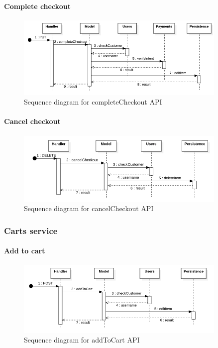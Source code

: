 \paragraph*{Complete checkout}
\begin{figure}[H]
    \includegraphics[width=0.9\textwidth]{res/images/sequence-diagrams/orders/completeCheckout.png}
    \caption{Sequence diagram for completeCheckout API}
\end{figure}

\paragraph*{Cancel checkout}
\begin{figure}[H]
    \includegraphics[width=0.9\textwidth]{res/images/sequence-diagrams/orders/cancelCheckout.png}
    \caption{Sequence diagram for cancelCheckout API}
\end{figure}

\subsubsection{Carts service}

\paragraph*{Add to cart}
\begin{figure}[H]
    \includegraphics[width=0.9\textwidth]{res/images/sequence-diagrams/carts/addToCart.png}
    \caption{Sequence diagram for addToCart API}
\end{figure}

